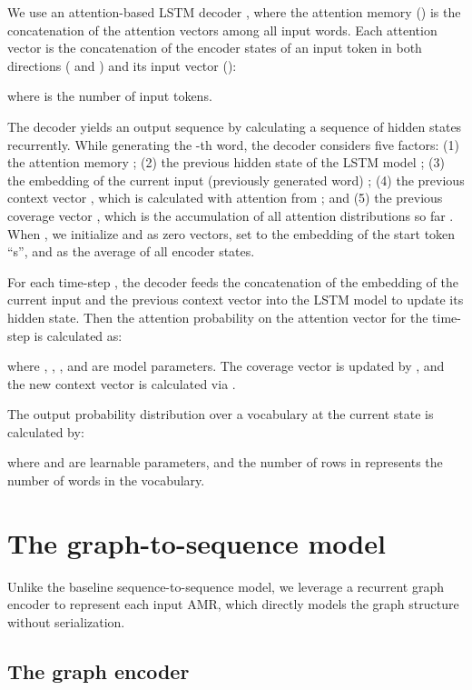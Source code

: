 \documentclass[11pt,a4paper]{article}
\begin{document}
We use an attention-based LSTM decoder \cite{bahdanau2015neural}, where the attention memory () is the concatenation of the attention vectors among all input words. 
Each attention vector  is the concatenation of the encoder states of an
input token in both directions ( and ) and its input vector ():

where  is the number of input tokens.


The decoder yields an output sequence  by calculating a sequence of hidden states  recurrently.
While generating the -th word, the decoder considers five factors: 
(1) the attention memory ; 
(2) the previous hidden state of the LSTM model ; 
(3) the embedding of the current input (previously generated word) ; 
(4) the previous context vector , which is calculated with attention from ; 
and (5) the previous coverage vector , which is the accumulation of all attention distributions so far \cite{tu-EtAl:2016:P16-1}. 
When , we initialize  and  as zero vectors, set  to the embedding of the start token ``s'', and   as the average of all encoder states.



For each time-step , the decoder feeds the concatenation of the embedding of the current input  and the previous context vector  into the LSTM model to update its hidden state.
Then the attention probability  on the attention vector  for the time-step is calculated as:

where , , ,  and  are model parameters.
The coverage vector  is updated by  , and the new context vector  is calculated via .


The output probability distribution over a vocabulary at the current state is calculated by:

where  and  are learnable parameters, and the number of rows in  represents the number of words in the vocabulary.


\section{The graph-to-sequence model}

Unlike the baseline sequence-to-sequence model,
we leverage a recurrent graph encoder to represent each input AMR, which directly models the graph structure without serialization. 

\subsection{The graph encoder}
\end{document}
